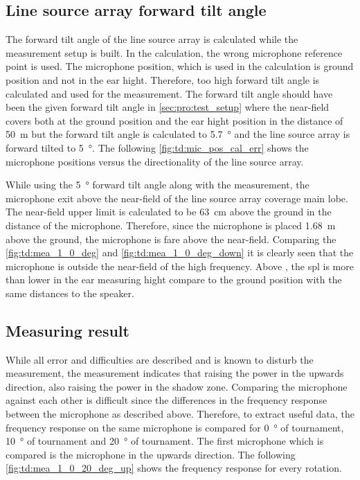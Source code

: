 \subsection{Line source array forward tilt angle}\label{sec:des:measuring_angle}
The forward tilt angle of the line source array is calculated while the measurement setup is built. In the calculation, the wrong microphone reference point is used. The microphone position, which is used in the calculation is ground position and not in the ear hight. Therefore, too high forward tilt angle is calculated and used for the measurement. The forward tilt angle should have been the given forward tilt angle in \autoref{sec:pro:test_setup} where the near-field covers both at the ground position and the ear hight position in the distance of \SI{50}{\meter} but the forward tilt angle is calculated to \SI{5.7}{\degree} and the line source array is forward tilted to \SI{5}{\degree}. The following \autoref{fig:td:mic_pos_cal_err} shows the microphone positions versus the directionality of the line source array.



While using the \SI{5}{\degree} forward tilt angle along with the measurement, the microphone exit above the near-field of the line source array coverage main lobe. The near-field upper limit is calculated to be \SI{63}{\centi\meter} above the ground in the distance of the microphone. Therefore, since the microphone is placed \SI{1.68}{\meter} above the ground, the microphone is fare above the near-field. Comparing the \autoref{fig:td:mea_1_0_deg} and \autoref{fig:td:mea_1_0_deg_down} it is clearly seen that the microphone is outside the near-field of the high frequency. Above , the \gls{spl} is more than  lower in the ear measuring hight compare to the ground position with the same distances to the speaker. 

\subsection{Measuring result}\label{sec:des:measuring_result}
While all error and difficulties are described and is known to disturb the measurement, the measurement indicates that raising the power in the upwards direction, also raising the power in the shadow zone. Comparing the microphone against each other is difficult since the differences in the frequency response between the microphone as described above. Therefore, to extract useful data, the frequency response on the same microphone is compared for \SI{0}{\degree} of tournament, \SI{10}{\degree} of tournament and \SI{20}{\degree} of tournament.   
The first microphone which is compared is the microphone in the upwards direction. The following \autoref{fig:td:mea_1_0_20_deg_up} shows the frequency response for every rotation.

